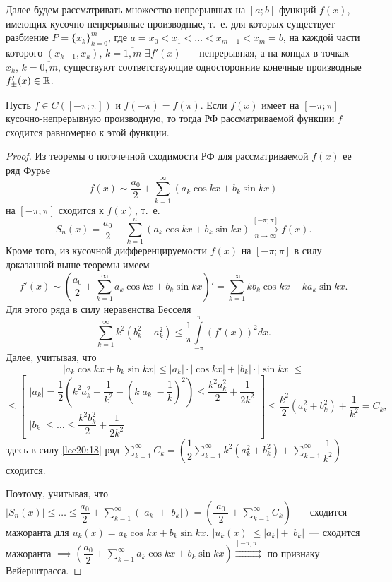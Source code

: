 \documentclass[../../main.tex]{subfiles}
\begin{document}
	Далее будем рассматривать множество непрерывных на $ [a; b] $
	функций $ f(x) $, имеющих кусочно-непрерывные производные, т.~е.
	для которых существует разбиение $ P = \{x_k\}_{k = 0}^m $, 
	где $ a = x_0 < x_1 < \dots < x_{m - 1} < x_m = b $, 
	на каждой части которого $(x_{k - 1}, x_k)$, $k = \overline{1, m}$ 
	$ \exists f'(x) $~--- непрерывная, а на концах в точках $ x_k $,
	$ k = \overline{0, m} $, существуют соответствующие односторонние
	конечные производные $f'_\pm(x) \in \mathbb{R}$.
	
	\begin{thm}
		Пусть $ f \in C([-\pi; \pi]) $ и $ f(-\pi) = f(\pi) $. 
		Если $ f(x) $ имеет на $ [-\pi; \pi] $ кусочно-непрерывную 
		производную, то тогда РФ рассматриваемой функции $f$
		сходится равномерно к этой функции.
	\end{thm}
	\begin{proof}
		Из теоремы о поточечной сходимости РФ для рассматриваемой 
		$ f(x) $ ее ряд Фурье 
		\[ f(x) \sim \dfrac{a_0}{2} + \sum\limits_{k = 1}^{\infty}
		(a_k\cos{kx} + b_k\sin{kx}) \]
		на $ [-\pi; \pi] $ сходится к $ f(x) $, т.~е.
		\[
		S_n(x) = \dfrac{a_0}{2} + \sum\limits_{k = 1}^n(
		a_k\cos{kx} + b_k\sin{kx}) 
		\stackrel{[-\pi; \pi]}{\underset{n \to \infty}{\to}} f(x).
		\]
		Кроме того, из кусочной дифференцируемости $ f(x) $ на 
		$ [-\pi; \pi] $ в силу доказанной выше теоремы имеем 
		\[
		f'(x) \sim \left(\dfrac{a_0}{2} + 
		\sum\limits_{k = 1}^\infty a_k\cos kx + b_k\sin kx
		\right)' = \sum\limits_{k = 1}^\infty kb_k\cos kx -
		ka_k\sin kx.
		\]
		Для этого ряда в силу неравенства Бесселя
		\begin{equation}
		\label{lec20:18}
		\sum\limits_{k = 1}^\infty k^2(b_k^2 + a_k^2) \leq
		\dfrac{1}{\pi} \int\limits_{-\pi}^\pi (f'(x))^2 dx.
		\end{equation}
		Далее, учитывая, что
		\[
		|a_k\cos kx + b_k\sin kx| \leq |a_k|\cdot|\cos kx| +
		|b_k|\cdot|\sin kx| \leq \]\[ \leq
		\begin{bmatrix}
		|a_k| = \dfrac{1}{2}\left(
		k^2a_k^2 + \dfrac{1}{k^2} - \left(
		k|a_k| - \dfrac{1}{k}\right)^2
		\right) \leq \dfrac{k^2a_k^2}{2} + \dfrac{1}{2k^2}\\
		|b_k| \leq \dots \leq \dfrac{k^2b_k^2}{2} + \dfrac{1}{2k^2}
		\end{bmatrix} \leq \dfrac{k^2}{2}(a_k^2 + b_k^2) + \dfrac{1}{k^2} = C_k,
		\]
		здесь в силу \eqref{lec20:18} ряд 
		$
		\sum\limits_{k = 1}^\infty C_k =
		\left(
		\dfrac{1}{2} \sum\limits_{k = 1}^\infty 
		k^2(a_k^2 + b_k^2) + \sum\limits_{k = 1}^\infty
		\dfrac{1}{k^2}
		\right)
		$ сходится.
		
		Поэтому, учитывая, что $ |S_n(x)| \leq \dots \leq
		\dfrac{a_0}{2} + \sum\limits_{k = 1}^\infty(|a_k| + |b_k|)  =
		\left(\dfrac{|a_0|}{2} + \sum\limits_{k = 1}^\infty C_k\right)$~---
		сходится мажоранта для $ u_k(x) = a_k\cos kx + b_k\sin kx$.
		$ |u_k(x)| \leq |a_k| + |b_k| $~--- сходится мажоранта $ \implies
		\left(
		\dfrac{a_0}{2} + \sum\limits_{k = 1}^\infty a_k\cos kx + b_k\sin kx
		\right) 
		\stackrel{[-\pi; \pi]}{\rightrightarrows}
		$ по признаку Вейерштрасса.
	\end{proof}
\end{document}

